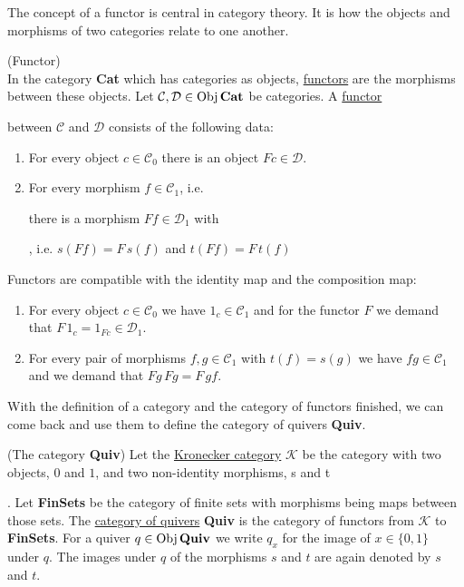 The concept of a functor is central in category theory. It is how the objects and morphisms of two categories relate to one another.

\begin{definition}{(Functor)}\\
In the category \textbf{Cat} which has categories as objects, \ul{functors} are the morphisms between these objects.
Let $\mathcal{C},\mathcal{D} \in \textup{Obj}\,\textbf{Cat}$ be categories. A \ul{functor}  between $\mathcal{C}$ and $\mathcal{D}$ consists
of the following data:
\renewcommand{\labelenumi}{(\theenumi)}
\begin{enumerate}
\item For every object $c \in \mathcal{C}_{0}$ there is an object $Fc \in \mathcal{D}$.
\item For every morphism $f \in \mathcal{C}_{1}$, i.e.  there is a morphism
$Ff \in \mathcal{D}_{1}$ with , i.e. $s(Ff) = F\,s(f)$ and $t(Ff) = F\,t(f)$
\setcounter{saveenum}{\value{enumi}}
\end{enumerate}
Functors are compatible with the identity map and the composition map:
\begin{enumerate}
\setcounter{enumi}{\value{saveenum}}
\item For every object $c \in \mathcal{C}_{0}$ we have $1_{c} \in \mathcal{C}_{1}$ and for the functor $F$ we demand that
$F\,1_{c} = 1_{Fc} \in \mathcal{D}_{1}$. 
\item For every pair of morphisms $f,g \in \mathcal{C}_{1}$ with $t(f) = s(g)$ we have $fg \in \mathcal{C}_{1}$ and we demand that
$Fg\,Fg = F\,gf$.
\end{enumerate}
\end{definition}

With the definition of a category and the category of functors finished, we can come back and use them to define the category of quivers
\textbf{Quiv}.

\begin{definition}{(The category \textbf{Quiv})}\cite{[4681]}
Let the \ul{Kronecker category} $\mathcal{K}$ be the category with two objects, $0$ and $1$, and two non-identity morphisms, s and t
.
Let \textbf{FinSets} be the category of finite sets with morphisms being maps between those sets.
The \ul{category of quivers} \textbf{Quiv} is the category of functors from $\mathcal{K}$ to \textbf{FinSets}.
For a quiver $q \in \textup{Obj}\,\textbf{Quiv}$ we write $q_{x}$ for the image of $x \in \{0,1\}$ under $q$.
The images under $q$ of the morphisms $s$ and $t$ are again denoted by $s$ and $t$.
\end{definition}


